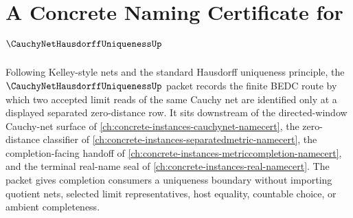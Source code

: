 \chapter{A Concrete Naming Certificate for $\CauchyNetHausdorffUniquenessUp$}
\label{ch:concrete-instances-cauchy-net-hausdorff-uniqueness-namecert}

Following Kelley-style nets and the standard Hausdorff uniqueness principle, the $\CauchyNetHausdorffUniquenessUp$ packet records the finite BEDC route by which two accepted limit reads of the same Cauchy net are identified only at a displayed separated zero-distance row. It sits downstream of the directed-window Cauchy-net surface of \autoref{ch:concrete-instances-cauchynet-namecert}, the zero-distance classifier of \autoref{ch:concrete-instances-separatedmetric-namecert}, the completion-facing handoff of \autoref{ch:concrete-instances-metriccompletion-namecert}, and the terminal real-name seal of \autoref{ch:concrete-instances-real-namecert}. The packet gives completion consumers a uniqueness boundary without importing quotient nets, selected limit representatives, host equality, countable choice, or ambient completeness.

